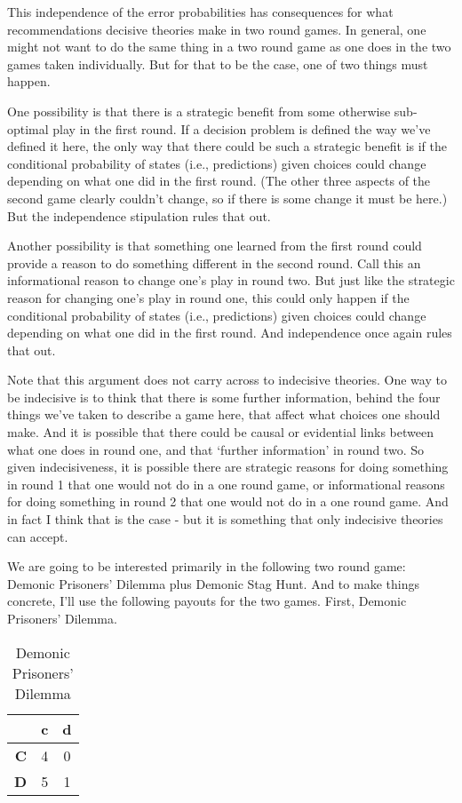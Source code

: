 \documentclass[
  12pt,
]{article}
\begin{document}
This independence of the error probabilities has consequences for what
recommendations decisive theories make in two round games. In general,
one might not want to do the same thing in a two round game as one does
in the two games taken individually. But for that to be the case, one of
two things must happen.

One possibility is that there is a strategic benefit from some otherwise
sub-optimal play in the first round. If a decision problem is defined
the way we've defined it here, the only way that there could be such a
strategic benefit is if the conditional probability of states (i.e.,
predictions) given choices could change depending on what one did in the
first round. (The other three aspects of the second game clearly
couldn't change, so if there is some change it must be here.) But the
independence stipulation rules that out.

Another possibility is that something one learned from the first round
could provide a reason to do something different in the second round.
Call this an informational reason to change one's play in round two. But
just like the strategic reason for changing one's play in round one,
this could only happen if the conditional probability of states (i.e.,
predictions) given choices could change depending on what one did in the
first round. And independence once again rules that out.

Note that this argument does not carry across to indecisive theories.
One way to be indecisive is to think that there is some further
information, behind the four things we've taken to describe a game here,
that affect what choices one should make. And it is possible that there
could be causal or evidential links between what one does in round one,
and that `further information' in round two. So given indecisiveness, it
is possible there are strategic reasons for doing something in round 1
that one would not do in a one round game, or informational reasons for
doing something in round 2 that one would not do in a one round game.
And in fact I think that is the case - but it is something that only
indecisive theories can accept.

We are going to be interested primarily in the following two round game:
Demonic Prisoners' Dilemma plus Demonic Stag Hunt. And to make things
concrete, I'll use the following payouts for the two games. First,
Demonic Prisoners' Dilemma.

\begin{table}[H]

\caption{\label{tab:unnamed-chunk-8}Demonic Prisoners' Dilemma}
\centering
\begin{tabular}[t]{>{}r|cc}

\textbf{} & \textbf{c} & \textbf{d}\\
\midrule
\textbf{C} & 4 & 0\\
\textbf{D} & 5 & 1\\

\end{tabular}
\end{table}
\end{document}
